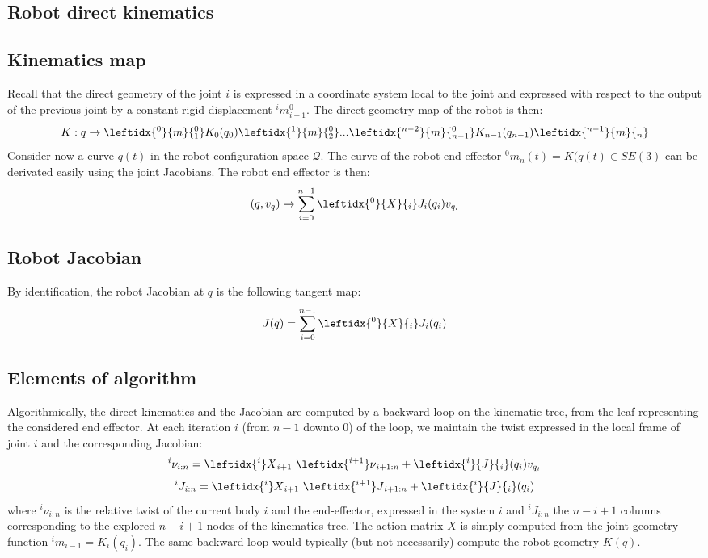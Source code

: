 \documentclass{book}
\begin{document}
\subsection{Robot direct kinematics}

\subsection{Kinematics map}
Recall that the direct geometry of the joint $i$ is expressed in a coordinate system local to the joint and expressed with respect to the output of the previous joint by a constant rigid displacement $^im_{i+1}^0$. The direct geometry map of the robot is then:
\[ K: q \rightarrow  \leftidx{^0}{m}{_{1}^0} K_0(q_0) \leftidx{^1}{m}{_{2}^0} ...   \leftidx{^{n-2}}{m}{_{n-1}^0} K_{n-1}(q_{n-1}) \leftidx{^{n-1}}{m}{_n} \]
Consider now a curve $q(t)$ in the robot configuration space $\mathcal{Q}$. The curve of the robot end effector $^0m_n(t) = K(q(t) \in SE(3)$ can be derivated easily using the joint Jacobians. The robot end effector is then:
\[ (q,v_q) \rightarrow  
\sum_{i=0}^{n-1} \leftidx{^0}{X}{_i} J_i(q_i) v_{q_i} 
\]

\subsection{Robot Jacobian}
By identification, the robot Jacobian at $q$ is the following tangent map:
$$ J(q) = \sum_{i=0}^{n-1} \leftidx{^0}{X}{_i} J_i(q_i) $$

\subsection{Elements of algorithm}
Algorithmically, the direct kinematics and the Jacobian are computed by a backward loop on the kinematic tree, from the leaf representing the considered end effector.  At each iteration $i$ (from $n-1$ downto $0$) of the loop, we maintain the twist expressed in the local frame of joint $i$ and the corresponding Jacobian:
$$ ^i\nu_{i:n} = \leftidx{^i}X{_{i+1}} \ \leftidx{^{i+1}}\nu{_{i+1:n}} + \leftidx{^i}{J}{_i}(q_i) v_{q_i} $$
$$ ^iJ_{i:n} = \leftidx{^i}X{_{i+1}} \ \leftidx{^{i+1}}J{_{i+1:n}} + \leftidx{^i}{J}{_i}(q_i) $$
where $^i\nu_{i:n}$ is the relative twist of the current body $i$ and the end-effector, expressed in the system $i$ and $^iJ_{i:n}$ the $n-i+1$ columns corresponding to the explored $n-i+1$ nodes of the kinematics tree. The action matrix $X$ is simply computed from the joint geometry function $^im_{i-1} = K_i(q_i)$. The same backward loop would typically (but not necessarily) compute the robot geometry $K(q)$.
\end{document}
